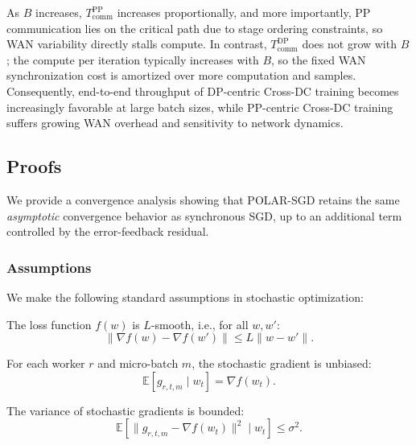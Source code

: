 As $B$ increases, $T_{\mathrm{comm}}^{\mathrm{PP}}$ increases proportionally, and more importantly, PP communication lies on the critical path due to stage ordering constraints, so WAN variability directly stalls compute. In contrast, $T_{\mathrm{comm}}^{\mathrm{DP}}$ does not grow with $B$; the compute per iteration typically increases with $B$, so the fixed WAN synchronization cost is amortized over more computation and samples. Consequently, end-to-end throughput of DP-centric Cross-DC training becomes increasingly favorable at large batch sizes, while PP-centric Cross-DC training suffers growing WAN overhead and sensitivity to network dynamics.

\subsection{Proofs}

We provide a convergence analysis showing that POLAR-SGD retains the same \emph{asymptotic} convergence behavior as synchronous SGD, up to an additional term controlled by the error-feedback residual.

\subsubsection{Assumptions}

We make the following standard assumptions in stochastic optimization:

\begin{assumption}[L-Smoothness]
\label{assump:smooth}
The loss function $f(w)$ is $L$-smooth, i.e., for all $w, w'$:
\begin{equation}
    \|\nabla f(w) - \nabla f(w')\| \leq L \|w - w'\|.
\end{equation}
\end{assumption}

\begin{assumption}
\label{assump:unbiased}
For each worker $r$ and micro-batch $m$, the stochastic gradient is unbiased:
\begin{equation}
\mathbb{E}\left[g_{r,t,m}\mid w_t\right] = \nabla f(w_t).
\end{equation}
\end{assumption}

\begin{assumption}
\label{assump:variance}
The variance of stochastic gradients is bounded:
\begin{equation}
\mathbb{E}\left[\|g_{r,t,m} - \nabla f(w_t)\|^2 \mid w_t\right] \le \sigma^2.
\end{equation}
\end{assumption}

